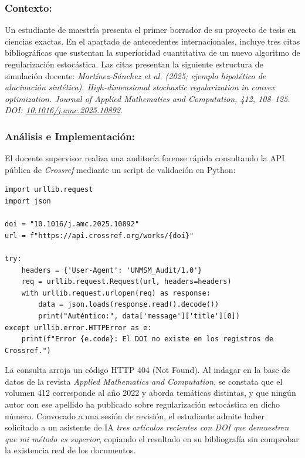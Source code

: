 \subsubsection*{Contexto:}
Un estudiante de maestría presenta el primer borrador de su proyecto de tesis en ciencias exactas. En el apartado de antecedentes internacionales, incluye tres citas bibliográficas que sustentan la superioridad cuantitativa de un nuevo algoritmo de regularización estocástica. Las citas presentan la siguiente estructura de simulación docente: \textsl{\guillemotleft Martínez-Sánchez et al. (2025; ejemplo hipotético de alucinación sintética). High-dimensional stochastic regularization in convex optimization. Journal of Applied Mathematics and Computation, 412, 108--125. DOI: \url{10.1016/j.amc.2025.10892}\guillemotright}.

\subsubsection*{Análisis e Implementación:}
El docente supervisor realiza una auditoría forense rápida consultando la API pública de \textit{Crossref} mediante un script de validación en Python:

\begin{tcolorbox}[colback=bg_marfil, colframe=unmsm_gold, arc=2pt, boxrule=0.5pt, top=0.2cm, bottom=0.2cm, left=0.3cm, right=0.3cm]
\small\ttfamily
\begin{verbatim}
import urllib.request
import json

doi = "10.1016/j.amc.2025.10892"
url = f"https://api.crossref.org/works/{doi}"

try:
    headers = {'User-Agent': 'UNMSM_Audit/1.0'}
    req = urllib.request.Request(url, headers=headers)
    with urllib.request.urlopen(req) as response:
        data = json.loads(response.read().decode())
        print("Auténtico:", data['message']['title'][0])
except urllib.error.HTTPError as e:
    print(f"Error {e.code}: El DOI no existe en los registros de Crossref.")
\end{verbatim}
\end{tcolorbox}

La consulta arroja un código HTTP 404 (Not Found). Al indagar en la base de datos de la revista \textit{Applied Mathematics and Computation}, se constata que el volumen 412 corresponde al año 2022 y aborda temáticas distintas, y que ningún autor con ese apellido ha publicado sobre regularización estocástica en dicho número. Convocado a una sesión de revisión, el estudiante admite haber solicitado a un asistente de IA \textsl{\guillemotleft tres artículos recientes con DOI que demuestren que mi método es superior\guillemotright}, copiando el resultado en su bibliografía sin comprobar la existencia real de los documentos.

